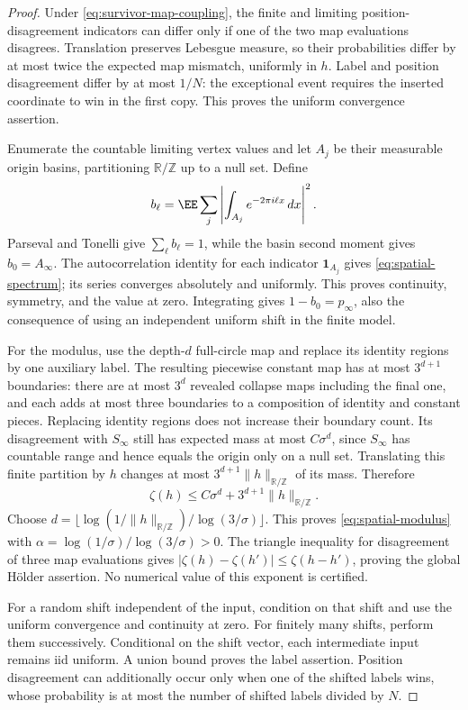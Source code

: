 \documentclass[11pt,letterpaper]{article}
\newcommand{\T}{\mathbb R/\mathbb Z}\newcommand{\Leb}{\operatorname{Leb}}
\newcommand{\ind}{\mathbf 1}\newcommand{\Exp}{\operatorname{Exp}}
\begin{document}
\begin{proof}
Under \eqref{eq:survivor-map-coupling}, the finite and limiting
position-disagreement indicators can differ only if one of the
two map evaluations disagrees. Translation preserves Lebesgue
measure, so their probabilities differ by at most twice the
expected map mismatch, uniformly in $h$. Label and position
disagreement differ by at most $1/N$: the exceptional event
requires the inserted coordinate to win in the first copy.
This proves the uniform convergence assertion.

Enumerate the countable limiting vertex values and let $A_j$ be
their measurable origin basins, partitioning $\T$ up to a null set.
Define
\[
 b_\ell=\EE\sum_j\left|
                  \int_{A_j}e^{-2\pi i\ell x}\,dx\right|^2.
\]
Parseval and Tonelli give $\sum_\ell b_\ell=1$, while the basin
second moment gives $b_0=A_\infty$.
The autocorrelation identity for each indicator $\ind_{A_j}$
gives \eqref{eq:spatial-spectrum}; its series converges absolutely
and uniformly. This proves continuity, symmetry, and the value at
zero. Integrating gives $1-b_0=p_\infty$, also the consequence
of using an independent uniform shift in the finite model.

For the modulus, use the depth-$d$ full-circle map and replace
its identity regions by one auxiliary label. The resulting
piecewise constant map has at most $3^{d+1}$ boundaries: there
are at most $3^d$ revealed collapse maps including the final
one, and each adds at most three boundaries to a composition
of identity and constant pieces. Replacing identity regions
does not increase their boundary count. Its disagreement with
$S_\infty$ still has expected mass at most $C\sigma^d$, since
$S_\infty$ has countable range and hence equals the origin
only on a null set.
Translating this finite partition by $h$ changes at most
$3^{d+1}\|h\|_{\T}$ of its mass. Therefore
\[
 \zeta(h)\le C\sigma^d+3^{d+1}\|h\|_{\T}.
\]
Choose $d=\lfloor\log(1/\|h\|_{\T})/\log(3/\sigma)\rfloor$.
This proves \eqref{eq:spatial-modulus} with
$\alpha=\log(1/\sigma)/\log(3/\sigma)>0$.
The triangle inequality for disagreement of three map evaluations
gives $|\zeta(h)-\zeta(h')|\le\zeta(h-h')$, proving the global
H\"older assertion. No numerical value of this exponent is certified.

For a random shift independent of the input, condition on that
shift and use the uniform convergence and continuity at zero.
For finitely many shifts, perform them successively. Conditional
on the shift vector, each intermediate input remains iid uniform.
A union bound proves the label assertion. Position disagreement
can additionally occur only when one of the shifted labels wins,
whose probability is at most the number of shifted labels divided
by $N$.
\end{proof}
\end{document}
